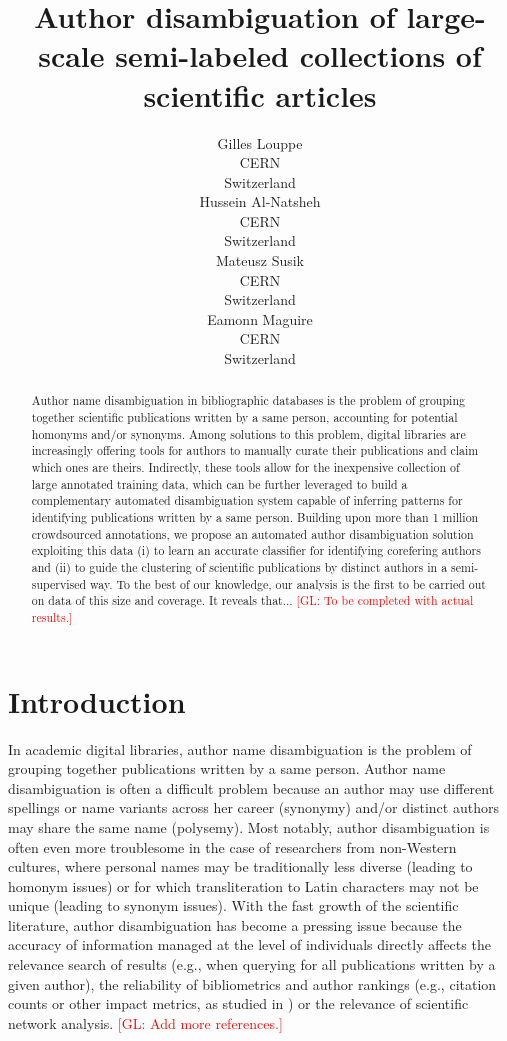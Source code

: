 \documentclass{article}
\title{Author disambiguation of large-scale semi-labeled collections of scientific articles}
\author{Gilles Louppe\\
        CERN\\
        Switzerland\\
\And Hussein Al-Natsheh\\
        CERN\\
        Switzerland\\
\And Mateusz Susik\\
        CERN\\
        Switzerland\\
\And Eamonn Maguire\\
        CERN\\
        Switzerland}
\date{}
\newcommand{\glnote}[1]{\textcolor{red}{[GL: #1]}}
\begin{document}
\maketitle

\begin{abstract}

Author name disambiguation in bibliographic databases is the problem of
grouping together scientific publications written by a same person, accounting
for potential homonyms and/or synonyms. Among solutions to this problem,
digital libraries are increasingly offering tools for authors to manually
curate their publications and claim which ones are theirs. Indirectly, these
tools allow for the inexpensive collection of large annotated training data,
which can be further leveraged to build a complementary automated
disambiguation system capable of inferring patterns for identifying
publications written by a same person.  Building upon more than 1 million
crowdsourced annotations, we propose an automated author disambiguation
solution exploiting this data (i) to learn an accurate classifier for
identifying corefering authors and (ii) to guide the clustering of scientific
publications by distinct authors in a semi-supervised way. To the best of our
knowledge, our analysis is the first to be carried out on data of this size and
coverage. It reveals that... \glnote{To be completed with actual results.}

\end{abstract}



\section{Introduction}
\label{introduction}


In academic digital libraries, author name disambiguation is the problem of
grouping together publications written by a same person.  Author name
disambiguation is often a difficult problem because an author may use different
spellings or name variants across her career (synonymy) and/or distinct authors may
share the same name (polysemy). Most notably, author disambiguation is often even more
troublesome in the case of researchers from non-Western cultures, where
personal names may be traditionally less diverse (leading to homonym issues) or
for which transliteration to Latin characters may not be unique (leading to
synonym issues). With the fast growth of the scientific literature, author
disambiguation has become a pressing issue because the accuracy of information
managed at the level of individuals directly affects the relevance search of
results (e.g., when querying for all publications written by a given author),
the reliability of bibliometrics and author rankings (e.g., citation counts or other impact
metrics, as studied in \citep{strotmann2012author}) or the relevance of scientific network analysis.
\glnote{Add more references.}
\end{document}
